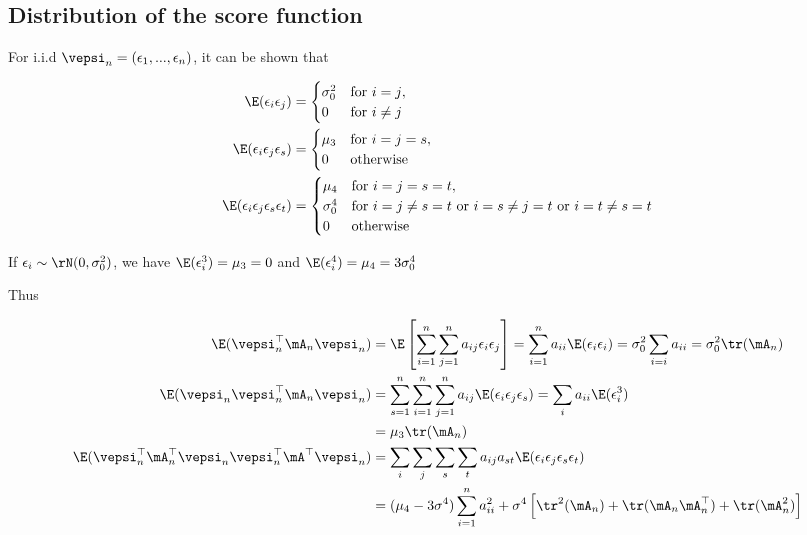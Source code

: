 \begin{subappendices}
 \section{Distribution of the score function}\label{appendix-score}

For i.i.d $\vepsi_n = (\epsilon_1, ..., \epsilon_n)$, it can be shown that

\begin{equation}
\begin{aligned}
\E(\epsilon_i\epsilon_j) & = 
\begin{cases}
  \sigma_0^2 & \mbox{for $i = j$}, \\
  0          &  \mbox{for $i\neq j$}
\end{cases} \\
\E(\epsilon_i\epsilon_j\epsilon_s) & =
\begin{cases}
  \mu_3 & \mbox{for $i = j = s$}, \\
  0          &  \mbox{otherwise}
\end{cases} \\
\E(\epsilon_i\epsilon_j\epsilon_s\epsilon_t) & =
\begin{cases}
  \mu_4 & \mbox{for $i = j = s = t$}, \\
   \sigma_0^4          &  \mbox{for $i=j \neq s=t$ or $i =s\neq j= t$ or $i = t \neq s = t$} \\
   0 & \mbox{otherwise}
\end{cases} \\
\end{aligned}
\end{equation}

If $\epsilon_i \sim \rN(0, \sigma_0^2)$, we have $\E(\epsilon_i^3) = \mu_3 = 0$ and $\E(\epsilon_i^4) = \mu_4 = 3\sigma_0^4$

Thus

\begin{equation}
\begin{aligned}
  \E(\vepsi_n^\top\mA_n\vepsi_n) & = \E\left[\sum_{i = 1}^n\sum_{j = 1}^na_{ij}\epsilon_i\epsilon_j\right] = \sum_{i = 1}^na_{ii}\E(\epsilon_i\epsilon_i) = \sigma^2_0\sum_{i = i}a_{ii} = \sigma_0^2\tr(\mA_n) \\
  \E(\vepsi_n\vepsi_n^\top\mA_n\vepsi_n) & = \sum_{s = 1}^n\sum_{i = 1}^n\sum_{j = 1}^n a_{ij}\E(\epsilon_i\epsilon_j\epsilon_s) = \sum_i a_{ii}\E(\epsilon_i^3) \\
  & =  \mu_3\tr(\mA_n) \\
\E(\vepsi_n^\top\mA_n^\top\vepsi_n\vepsi_n^\top\mA^\top\vepsi_n) & = \sum_i\sum_j\sum_s\sum_ta_{ij}a_{st}\E(\epsilon_i\epsilon_j\epsilon_s\epsilon_t) \\
& = (\mu_4 - 3\sigma^4)\sum_{i = 1}^na_{ii}^2 + \sigma^4\left[\tr^2(\mA_n) + \tr(\mA_n\mA_n^\top)+\tr(\mA_n^2)\right]
\end{aligned}
\end{equation}


\end{subappendices}
